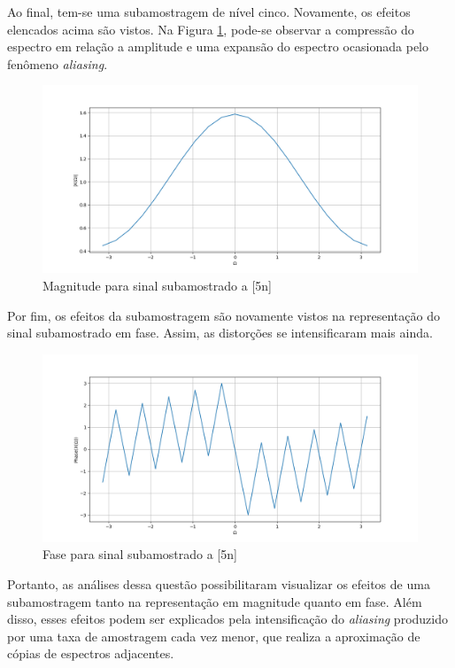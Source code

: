 Ao final, tem-se uma subamostragem de nível cinco. Novamente, os efeitos elencados acima são vistos. Na Figura \ref{fig:graph_15}, pode-se observar a compressão do espectro em relação a amplitude e uma expansão do espectro ocasionada pelo fenômeno \textit{aliasing}.

\begin{figure}[!htb]
    \centering
    \includegraphics[width=\linewidth]{Imagens/fig15.png}
    \caption{Magnitude para sinal subamostrado a [5n]}
    \label{fig:graph_15}
\end{figure}

Por fim, os efeitos da subamostragem são novamente vistos na representação do sinal subamostrado em fase. Assim, as distorções se intensificaram mais ainda.

\begin{figure}[!htb]
    \centering
    \includegraphics[width=\linewidth]{Imagens/fig16.png}
    \caption{Fase para sinal subamostrado a [5n]}
    \label{fig:graph_16}
\end{figure}

Portanto, as análises dessa questão possibilitaram visualizar os efeitos de uma subamostragem tanto na representação em magnitude quanto em fase. Além disso, esses efeitos podem ser explicados pela intensificação do \textit{aliasing} produzido por uma taxa de amostragem cada vez menor, que realiza a aproximação de cópias de espectros adjacentes. 
